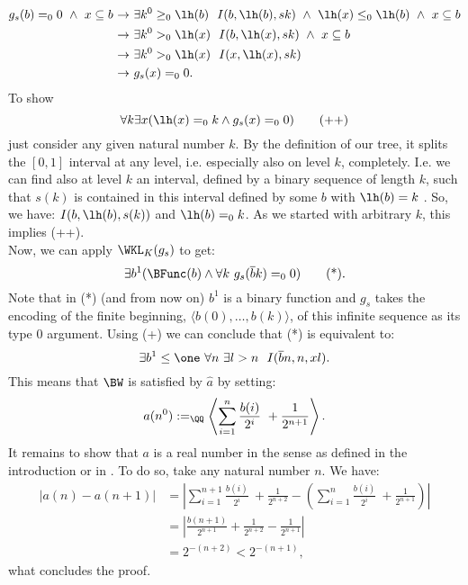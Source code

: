 \begin{align*}
  g_s(b)=_00\ \wedge\ x\subseteq b 
           &{\ \rightarrow\ }  \exists k^0\geq_0\lh(b)\ \ I( b,\lh(b),sk)\ \wedge\ 
                              \lh(x)\leq_0\lh(b)\ \wedge\ 
                              x\subseteq b \\
               &{\ \rightarrow\ } \exists k^0>_0\lh(x)\ \ I( b,\lh(x),sk)\ \wedge\ 
                              x\subseteq b\  \\
               &{\ \rightarrow\ } \exists k^0>_0\lh(x)\ \ I( x,\lh(x),sk)\\
               &{\ \rightarrow\ }g_s(x)=_00
\text{.}
\end{align*}
To show 
\[
\forall k\exists x (\lh(x)=_0k \wedge g_s(x)=_00) \tag{++}
\]
just consider any given 
natural number $k$. By the definition of our tree, it splits the $[0,1]$ 
interval at any level, i.e. especially also on level $k$, completely. 
I.e. we can find also at level $k$ an interval, defined by a binary 
sequence of length $k$, such that $s(k)$ is contained in this
interval defined by some $b$ with $\lh(b)=k$  . 
So, we have: $I( b, \lh(b), s(k))$ and $ \lh(b)=_0k$. 
As we started with arbitrary $k$, this implies (++).\\
Now, we can apply $\WKL_K(g_s)$ to get:
\[
\exists b^1 (\BFunc(b) \wedge \forall k\ g_s(\overline{b}k)=_00) 
\tag{*}
\text{.}
\]
Note that in (*) (and from now on) $b^1$ is 
a binary function and $g_s$ takes
the encoding of the finite beginning, $\langle b(0),\ldots,b(k)\rangle$, 
of this infinite sequence as its type $0$ argument.
Using (+) we can conclude that (*) is equivalent to:
\[
\exists b^1\leq\one\ \forall n\ \exists l>n\ \ I(\overline{b}n,n,xl)
\text{.}\]
This means that $\BW$ is satisfied by $\hat a$ by setting:
\[
a(n^0):=_\QQ \left\langle \sum_{i=1}^n \frac{b(i)}{2^i}\ +
               \frac{1}{2^{n+1}}\right\rangle
\text{.}
\]
%
It remains to show that $a$ is a real 
number in the sense as defined in the introduction or in \cite{KO02}.
To do so, take any natural number $n$. We have:
\begin{align*}
|a(n)-a(n+1)|&=
\left|
\sum_{i=1}^{n+1} \frac{b(i)}{2^i}\ +
 \frac{1}{2^{n+2}}
-
{\left(\sum_{i=1}^n \frac{b(i)}{2^i}\ +
 \frac{1}{2^{n+1}}\right)}
\right|
\\
&=
\left|
\frac{b(n+1)}{2^{n+1}}+\frac{1}{2^{n+2}}
-
\frac{1}{2^{n+1}}
\right|
\\
&=
2^{-(n+2)} < 2^{-(n+1)}
\text{,}
\end{align*}
what concludes the proof.

